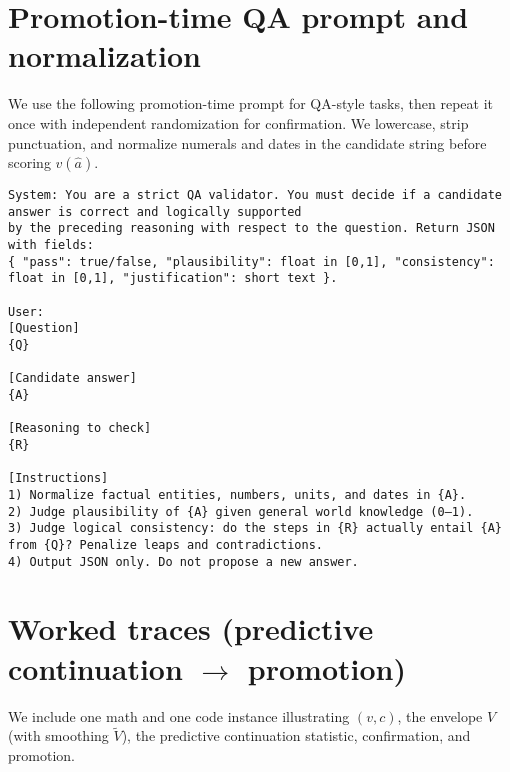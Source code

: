 \documentclass{article}
\begin{document}
\section{Promotion-time QA prompt and normalization}
\label{app:qa-prompt}
We use the following promotion-time prompt for QA-style tasks, then repeat it once with independent randomization for confirmation.
We lowercase, strip punctuation, and normalize numerals and dates in the candidate string before scoring $v(\hat a)$.
\begin{verbatim}
System: You are a strict QA validator. You must decide if a candidate answer is correct and logically supported
by the preceding reasoning with respect to the question. Return JSON with fields:
{ "pass": true/false, "plausibility": float in [0,1], "consistency": float in [0,1], "justification": short text }.

User:
[Question]
{Q}

[Candidate answer]
{A}

[Reasoning to check]
{R}

[Instructions]
1) Normalize factual entities, numbers, units, and dates in {A}.
2) Judge plausibility of {A} given general world knowledge (0–1).
3) Judge logical consistency: do the steps in {R} actually entail {A} from {Q}? Penalize leaps and contradictions.
4) Output JSON only. Do not propose a new answer.
\end{verbatim}

\section{Worked traces (predictive continuation $\to$ promotion)}
\label{app:worked-traces}
We include one math and one code instance illustrating $(v,c)$, the envelope $V$ (with smoothing $\tilde V$), the predictive continuation statistic, confirmation, and promotion.
\end{document}

